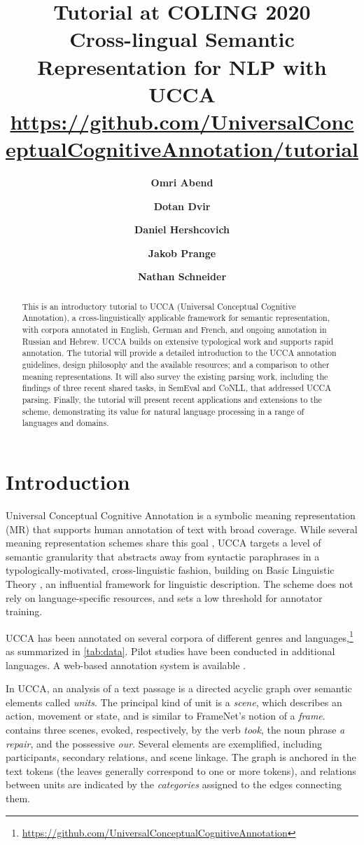 \documentclass[11pt,a4paper,table]{article}
\title{Tutorial at COLING 2020 \\
Cross-lingual Semantic Representation for NLP with UCCA \\
\normalsize\url{https://github.com/UniversalConceptualCognitiveAnnotation/tutorial}}
\author[*]{\textbf{Omri Abend}}
\author[*]{\textbf{Dotan Dvir}}
\author[**]{\textbf{Daniel Hershcovich}}
\author[***]{\textbf{Jakob Prange}}
\author[***]{\textbf{Nathan Schneider}}
\affil[*]{Hebrew University of Jerusalem}
\affil[**]{University of Copenhagen}
\affil[***]{Georgetown University}
\affil[ ]{
\texttt{oabend@cs.huji.ac.il},\quad
\texttt{dotan.dvir@mail.huji.ac.il},\quad
\texttt{dh@di.ku.dk}}
\affil[ ]{
\texttt{jakob@cs.georgetown.edu},\quad
\texttt{nathan.schneider@georgetown.edu}
}
\begin{document}
\maketitle

\begin{abstract}
This is an introductory tutorial to UCCA (Universal Conceptual Cognitive Annotation), a cross-linguistically applicable framework for semantic representation, with corpora annotated in English, German and French, and ongoing annotation in Russian and Hebrew. UCCA builds on extensive typological work and supports rapid annotation. The tutorial will provide a detailed introduction to the UCCA annotation guidelines, design philosophy and the available resources; and a comparison to other meaning representations. It will also survey the existing parsing work, including the findings of three recent shared tasks, in SemEval and CoNLL, that addressed UCCA parsing. Finally, the tutorial will present recent applications and extensions to the scheme, demonstrating its value for natural language processing in a range of languages and domains.
\end{abstract}


\section{Introduction}\label{sec:introduction}

Universal Conceptual Cognitive Annotation \cite[UCCA;][]{abend2013universal} 
is a symbolic meaning representation (MR)
that supports human annotation of text with broad coverage.
While several meaning representation schemes share this goal
\citep{abend2017state}, UCCA targets a level of semantic granularity that abstracts away from syntactic paraphrases in a typologically-motivated, cross-linguistic fashion, building on Basic Linguistic Theory \citep{Dixon:basic}, an influential framework for linguistic description.
The scheme does not rely on language-specific resources, and sets a low
threshold for annotator training.

UCCA has been annotated on several corpora of different genres and
languages,\footnote{\scriptsize\url{https://github.com/UniversalConceptualCognitiveAnnotation}} as summarized in \cref{tab:data}.
Pilot studies have been conducted in additional languages.
A web-based annotation system is available \cite{abend2017uccaapp}.

In UCCA, an analysis of a text passage is a directed acyclic graph
over semantic elements called \textit{units}.
The principal kind of unit is a \textit{scene},
which describes an action, movement or state, and is similar to FrameNet's notion of a {\it frame}.
 contains three scenes, evoked, respectively,
by the verb \textit{took},
the noun phrase \textit{a repair}, and the possessive \textit{our}.
Several elements are exemplified, including participants,
secondary relations, and scene linkage.
The graph is anchored in the text tokens (the leaves generally correspond to one or more tokens), and relations between units
are indicated by the \textit{categories} assigned to the edges connecting them.
\end{document}
